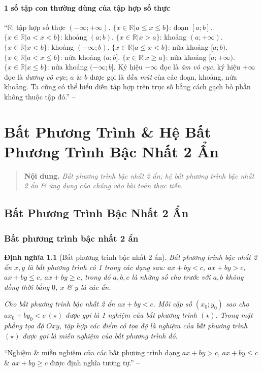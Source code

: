 \documentclass[oneside]{book}
\numberwithin{equation}{section}
\newtheorem{dinhnghia}{Định nghĩa}[section]
\begin{document}
\subsubsection{1 số tập con thường dùng của tập hợp số thực}
``$\mathbb{R}$: tập hợp số thực $(-\infty;+\infty)$. $\{x\in\mathbb{R}|a\le x\le b\}$: đoạn $[a;b]$. $\{x\in\mathbb{R}|a < x < b\}$: khoảng $(a;b)$. $\{x\in\mathbb{R}|x  > a\}$: khoảng $(a;+\infty)$. $\{x\in\mathbb{R}|x < b\}$: khoảng $(-\infty;b)$. $\{x\in\mathbb{R}|a\le x < b\}$: nửa khoảng $[a;b)$. $\{x\in\mathbb{R}|a < x\le b\}$: nửa khoảng $(a;b]$. $\{x\in\mathbb{R}|x\ge a\}$: nửa khoảng $[a;+\infty)$. $\{x\in\mathbb{R}|x\le b\}$: nửa khoảng $(-\infty;b]$. Ký hiệu $-\infty$ đọc là \textit{âm vô cực}, ký hiệu $+\infty$ đọc là \textit{dương vô cực}; $a$ \& $b$ được gọi là \textit{đầu mút} của các đoạn, khoảng, nửa khoảng. Ta cũng có thể biểu diễn tập hợp trên trục số bằng cách gạch bỏ phần không thuộc tập đó.'' -- \cite[p. 17]{SGK_Toan_10_Canh_Dieu_tap_1}


\chapter{Bất Phương Trình \& Hệ Bất Phương Trình Bậc Nhất 2 Ẩn}

\begin{quotation}
	\textbf{Nội dung.} \textit{Bất phương trình bậc nhất 2 ẩn; hệ bất phương trình bậc nhất 2 ẩn \& ứng dụng của chúng vào bài toán thực tiễn}.
\end{quotation}

\section{Bất Phương Trình Bậc Nhất 2 Ẩn}

\subsection{Bất phương trình bậc nhất 2 ẩn}

\begin{dinhnghia}[Bất phương trình bậc nhất 2 ẩn]
	\emph{Bất phương trình bậc nhất 2 ẩn $x,y$} là bất phương trình có 1 trong các dạng sau: $ax + by < c$, $ax + by > c$, $ax + by\le c$, $ax + by\ge c$, trong đó $a,b,c$ là những số cho trước với $a,b$ không đồng thời bằng $0$, $x$ \& $y$ là các ẩn.
	
	Cho bất phương trình bậc nhất 2 ẩn $ax + by < c$. Mỗi cặp số $(x_0;y_0)$ sao cho $ax_0 + by_0 < c\ (\star)$  được gọi là 1 \emph{nghiệm} của bất phương trình $(\star)$. Trong mặt phẳng tọa độ $Oxy$, tập hợp các điểm có tọa độ là nghiệm của bất phương trình $(\star)$ được gọi là \emph{miền nghiệm} của bất phương trình đó.
\end{dinhnghia}
``Nghiệm \& miền nghiệm của các bất phương trình dạng $ax + by > c$, $ax + by\le c$ \& $ax + by\ge c$ được định nghĩa tương tự.'' -- \cite[p. 21]{SGK_Toan_10_Canh_Dieu_tap_1}
\end{document}
